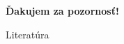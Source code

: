 \documentclass[xcolor=dvipsnames, compress, 12pt]{beamer}
\theoremstyle{definition}
\begin{document}
\section{}

\begin{frame}[plain, c]
  \transdissolve[duration=5]
  \begin{center}
  \textbf{\color{Green} \LARGE Ďakujem za pozornosť!}
  \end{center}


\end{frame}

\begin{frame}[t]{Literatúra}
  
  
\end{frame}
\end{document}
